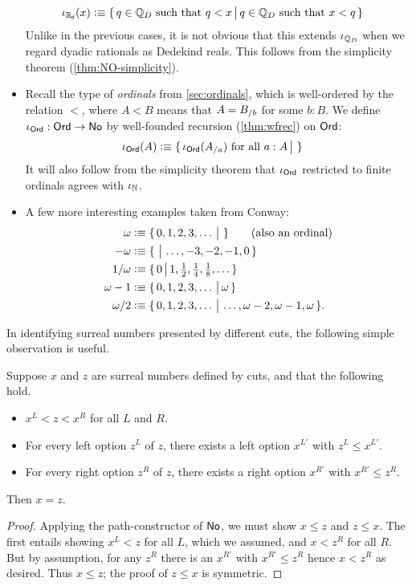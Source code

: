 \begin{itemize}
  \begin{align*}
    \iota_{\mathbb{R}_\mathsf{d}}(x) &\vcentcolon\equiv
    \{\,q\in\mathbb{Q}_D \text{ such that } q<x\,\big|\,q\in\mathbb{Q}_D \text{ such that } x<q\,\}
  \end{align*}
  Unlike in the previous cases, it is not obvious that this extends $\iota_{\mathbb{Q}_D}$ when we regard dyadic rationals as Dedekind reals.
  This follows from the simplicity theorem (\autoref{thm:NO-simplicity}).
\item Recall the type \ord of \emph{ordinals} from \autoref{sec:ordinals}, which is well-ordered by the relation $<$, where $A<B$ means that $A = {B}_{/b}$ for some $b:B$.
  We define $\iota_{\mathsf{Ord}}:\mathsf{Ord}\to\mathsf{No}$ by well-founded recursion (\autoref{thm:wfrec}) on $\mathsf{Ord}$:
  \begin{align*}
    \iota_{\mathsf{Ord}}(A) &\vcentcolon\equiv
    \{\,\iota_\mathsf{Ord}({A}_{/a}) \text{ for all } a:A\,\big|\,\,\}
  \end{align*}
  It will also follow from the simplicity theorem that $\iota_\mathsf{Ord}$ restricted to finite ordinals agrees with $\iota_\mathbb{N}$.
\item A few more interesting examples taken from Conway:
  \begin{align*}
    \omega &\vcentcolon\equiv \{\,0,1,2,3,\dots\,\big|\,\,\} \qquad\text{(also an ordinal)}\\
    -\omega &\vcentcolon\equiv \{\,\,\big|\,\dots,-3,-2,-1,0\,\}\\
    1/\omega &\vcentcolon\equiv \textstyle\{\,0\,\big|\,1,\frac12,\frac14,\frac18,\dots\,\}\\
    \omega-1 &\vcentcolon\equiv \{\,0,1,2,3,\dots\,\big|\,\omega\,\}\\
    \omega/2 &\vcentcolon\equiv \{\,0,1,2,3,\dots\,\big|\,\dots,\omega-2,\omega-1,\omega\,\}.
  \end{align*}
\end{itemize}

In identifying surreal numbers presented by different cuts, the following simple observation is useful.

\begin{thm}\label{thm:NO-simplicity}
  Suppose $x$ and $z$ are surreal numbers defined by cuts, and that the following hold.
  \begin{itemize}
  \item $x^L < z < x^R$ for all $L$ and $R$.
  \item For every left option $z^L$ of $z$, there exists a left option $x^{L'}$ with $z^L\le x^{L'}$.
  \item For every right option $z^R$ of $z$, there exists a right option $x^{R'}$ with $x^{R'}\le z^R$.
  \end{itemize}
  Then $x=z$.
\end{thm}
\begin{proof}
  Applying the path-constructor of $\mathsf{No}$, we must show $x\le z$ and $z\le x$.
  The first entails showing $x^L<z$ for all $L$, which we assumed, and $x<z^R$ for all $R$.
  But by assumption, for any $z^R$ there is an $x^{R'}$ with $x^{R'}\le z^R$ hence $x<z^R$ as desired.
  Thus $x\le z$; the proof of $z\le x$ is symmetric.
\end{proof}

